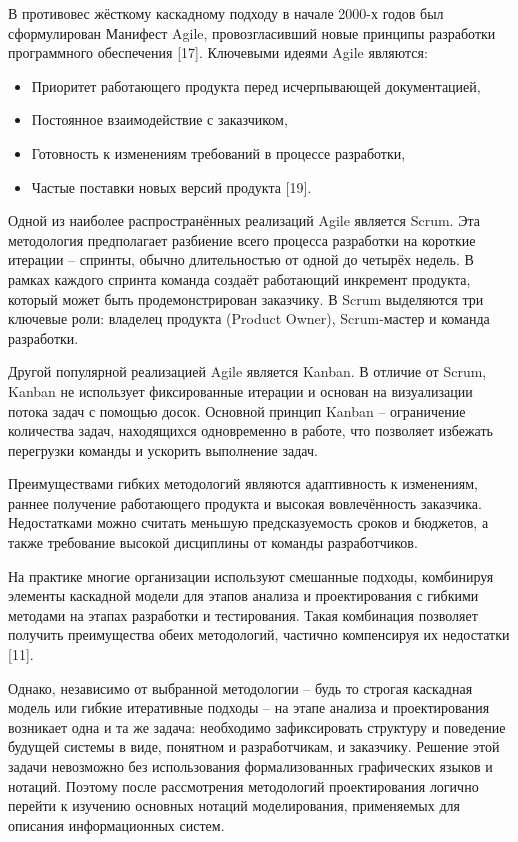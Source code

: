 \documentclass[14pt,a4paper]{extarticle}
\begin{document}
В противовес жёсткому каскадному подходу в начале 2000-х годов был
сформулирован Манифест Agile, провозгласивший новые принципы разработки
программного обеспечения [17]. Ключевыми идеями Agile являются:

\begin{itemize}
\item
  Приоритет работающего продукта перед исчерпывающей документацией,
\item
  Постоянное взаимодействие с заказчиком,
\item
  Готовность к изменениям требований в процессе разработки,
\item
  Частые поставки новых версий продукта [19].
\end{itemize}

Одной из наиболее распространённых реализаций Agile является Scrum. Эта
методология предполагает разбиение всего процесса разработки на короткие
итерации -- спринты, обычно длительностью от одной до четырёх недель. В
рамках каждого спринта команда создаёт работающий инкремент продукта,
который может быть продемонстрирован заказчику. В Scrum выделяются три
ключевые роли: владелец продукта (Product Owner), Scrum-мастер и команда
разработки.

Другой популярной реализацией Agile является Kanban. В отличие от Scrum,
Kanban не использует фиксированные итерации и основан на визуализации
потока задач с помощью досок. Основной принцип Kanban -- ограничение
количества задач, находящихся одновременно в работе, что позволяет
избежать перегрузки команды и ускорить выполнение задач.

Преимуществами гибких методологий являются адаптивность к изменениям,
раннее получение работающего продукта и высокая вовлечённость заказчика.
Недостатками можно считать меньшую предсказуемость сроков и бюджетов, а
также требование высокой дисциплины от команды разработчиков.

На практике многие организации используют смешанные подходы, комбинируя
элементы каскадной модели для этапов анализа и проектирования с гибкими
методами на этапах разработки и тестирования. Такая комбинация позволяет
получить преимущества обеих методологий, частично компенсируя их
недостатки [11].

Однако, независимо от выбранной методологии -- будь то строгая каскадная
модель или гибкие итеративные подходы -- на этапе анализа и
проектирования возникает одна и та же задача: необходимо зафиксировать
структуру и поведение будущей системы в виде, понятном и разработчикам,
и заказчику. Решение этой задачи невозможно без использования
формализованных графических языков и нотаций. Поэтому после рассмотрения
методологий проектирования логично перейти к изучению основных нотаций
моделирования, применяемых для описания информационных систем.
\end{document}
